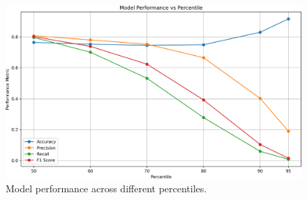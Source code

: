 \documentclass[conference,9pt]{IEEEtran}
\begin{document}
\begin{figure}[h]
    \centering
    \includegraphics[width=\columnwidth]{./performance_vs_percentile.png}
    \caption{Model performance across different percentiles.}
    \label{fig:perc}
\end{figure}
\end{document}
